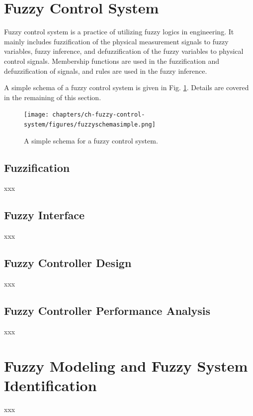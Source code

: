 \section{Fuzzy Control System}

Fuzzy control system is a practice of utilizing fuzzy logics in engineering. It mainly includes fuzzification of the physical measurement signals to fuzzy variables, fuzzy inference, and defuzzification of the fuzzy variables to physical control signals. Membership functions are used in the fuzzification and defuzzification of signals, and rules are used in the fuzzy inference.

A simple schema of a fuzzy control system is given in Fig. \ref{ch:fcs:fig:fuzzyschemasimple}. Details are covered in the remaining of this section.

\begin{figure}
	\centering
	\texttt{[image: chapters/ch-fuzzy-control-system/figures/fuzzyschemasimple.png]}
	\caption{A simple schema for a fuzzy control system.}
	\label{ch:fcs:fig:fuzzyschemasimple}
\end{figure}

\subsection{Fuzzification}

xxx

\subsection{Fuzzy Interface}

xxx

\subsection{Fuzzy Controller Design}

xxx

\subsection{Fuzzy Controller Performance Analysis}

xxx

\section{Fuzzy Modeling and Fuzzy System Identification}

xxx

